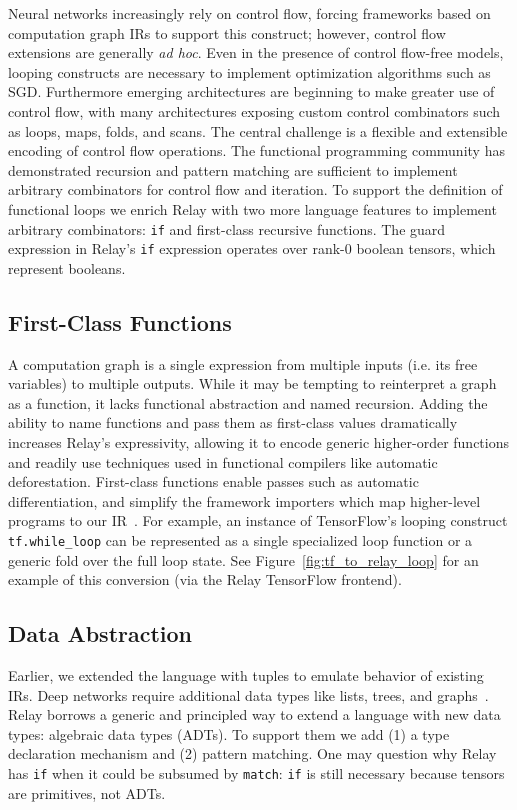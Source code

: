   Neural networks increasingly rely on control flow, forcing frameworks based on computation graph IRs
  to support this construct; however, control flow extensions are generally \textit{ad hoc}.
  Even in the presence of control flow-free models, looping
    constructs are necessary to implement optimization algorithms
    such as SGD.
  Furthermore emerging architectures are beginning to make greater use of
     control flow, with many architectures exposing custom control
     combinators such as loops, maps, folds, and scans.
  The central challenge is a flexible and extensible encoding of
    control flow operations.
  The functional programming community has demonstrated recursion and pattern matching are sufficient
    to implement arbitrary combinators for control flow and iteration.
  To support the definition of functional loops we enrich Relay with two more language
    features to implement arbitrary combinators: \verb|if| and first-class recursive functions.
  The guard expression in Relay's \verb|if| expression operates over rank-0 boolean tensors,
    which represent booleans.

  \subsection{First-Class Functions}

  A computation graph is a single expression
    from multiple inputs (i.e. its free variables) to multiple outputs.
  While it may be tempting to reinterpret a graph as a function, it lacks functional abstraction
    and named recursion.
  Adding the ability to name functions and pass them as first-class values dramatically increases
    Relay's expressivity, allowing it to encode generic
    higher-order functions and readily use techniques used in functional
    compilers like automatic deforestation.
  First-class functions enable passes such as
    automatic differentiation, and simplify
    the framework importers which map higher-level programs to our IR~\citep{myia}.
  For example, an instance of TensorFlow's looping construct \verb|tf.while_loop|
    can be represented as a single specialized loop function
    or a generic fold over the full loop state.
  See Figure~\ref{fig:tf_to_relay_loop} for an example of this conversion (via
    the Relay TensorFlow frontend).

  \subsection{Data Abstraction}
  Earlier, we extended the language with tuples to
    emulate behavior of existing IRs.
  Deep networks require additional data types like lists,
    trees, and graphs~\citep{char-rnn, tree_lstm, graph_lstm}.
  Relay borrows a generic and principled way to
    extend a language with new data types:
    algebraic data types (ADTs).
  To support them we add (1) a type declaration mechanism and
    (2) pattern matching.
  One may question why Relay has \verb|if| when it could be subsumed by \verb|match|:
    \verb|if| is still necessary because tensors are primitives, not ADTs.

